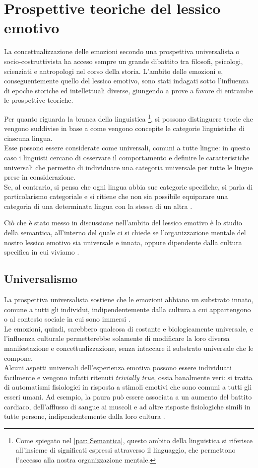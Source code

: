 \section{Prospettive teoriche del lessico emotivo}
La concettualizzazione delle emozioni secondo una prospettiva universalista o socio-costruttivista ha acceso sempre un grande dibattito tra filosofi, psicologi, scienziati e antropologi nel corso della storia. L'ambito delle emozioni e, conseguentemente quello del lessico emotivo, sono stati indagati sotto l'influenza di epoche storiche ed intellettuali diverse, giungendo a prove a favore di entrambe le prospettive teoriche.

Per quanto riguarda la branca della linguistica \footnote{Come spiegato nel \autoref{par: Semantica}, questo ambito della linguistica si riferisce all'insieme di significati espressi attraverso il linguaggio, che permettono l'accesso alla nostra organizzazione mentale.}, si possono distinguere teorie che vengono suddivise in base a come vengono concepite le categorie linguistiche di ciascuna lingua.\\
Esse possono essere considerate come universali, comuni a tutte lingue: in questo caso i linguisti cercano di  osservare il comportamento e definire le caratteristiche universali che permetto di individuare una categoria universale per tutte le lingue prese in considerazione.\\
Se, al contrario, si pensa che ogni lingua abbia sue categorie specifiche, si parla di particolarismo categoriale e si ritiene che non sia possibile equiparare una categoria di una determinata lingua con la stessa di un altra \parencite{haspelmath}. 

Ciò che è stato messo in discussione nell'ambito del lessico emotivo è lo studio della semantica, all'interno del quale ci si chiede se l'organizzazione mentale del nostro lessico emotivo sia universale e innata, oppure dipendente dalla cultura specifica in cui viviamo \parencite{universal_structure}.

\subsection{Universalismo}
La prospettiva universalista sostiene che le emozioni abbiano un substrato innato, comune a tutti gli individui, indipendentemente dalla cultura a cui appartengono o al contesto sociale in cui sono immersi \parencite{izard_article}.\\
Le emozioni, quindi, sarebbero qualcosa di costante e biologicamente universale, e l'influenza culturale permetterebbe solamente di modificare la loro diversa manifestazione e concettualizzazione, senza intaccare il substrato universale che le compone.\\
Alcuni aspetti universali dell'esperienza emotiva possono essere individuati facilmente e vengono 
infatti ritenuti \textit{trivially true}, ossia banalmente veri: si tratta di automatismi fisiologici in risposta a stimoli emotivi che sono comuni a tutti gli esseri umani. Ad esempio, la paura può essere associata a un aumento del battito cardiaco, dell'afflusso di sangue ai muscoli e ad altre risposte fisiologiche simili in tutte persone, indipendentemente dalla loro cultura \parencite{storia_delle_emozioni}.

